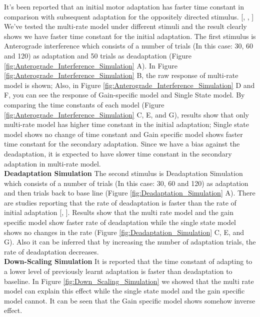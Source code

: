 \documentclass[9pt,twocolumn]{paper-template}
\begin{document}
It’s been reported that an initial motor adaptation has faster time constant in comparison with subsequent adaptation for the oppositely directed stimulus. [\cite{Bizzi}, \cite{shadmehr_jn}, \cite{Wolpert}] We’ve tested the multi-rate model under different stimuli and the result clearly shows we have faster time constant for the initial adaptation. 
The first stimulus is Anterograde interference which consists of a number of trials (In this case: 30, 60 and 120) as adaptation and 50 trials as deadaptation (Figure \ref{fig:Anterograde_Interference_Simulation} A). In Figure \ref{fig:Anterograde_Interference_Simulation} B, the raw response of multi-rate model is shown; Also, in Figure \ref{fig:Anterograde_Interference_Simulation} D and F, you can see the response of Gain-specific model and Single State model. By comparing the time constants of each model (Figure \ref{fig:Anterograde_Interference_Simulation} C, E, and G), results show that only multi-rate model has higher time constant in the initial adaptation; Single state model shows no change of time constant and Gain specific model shows faster time constant for the secondary adaptation. Since we have a bias against the deadaptation, it is expected to have slower time constant in the secondary adaptation in multi-rate model.\\



\textbf{Deadaptation Simulation }
The second stimulus is Deadaptation Simulation which consists of a number of trials (In this case: 30, 60 and 120) as adaptation and then trials back to base line (Figure \ref{fig:Deadaptation_Simulation} A). There are studies reporting that the rate of deadaptation is faster than the rate of initial adaptation [\cite{Wolpert}, \cite{shadmehr_jnp}]. Results show that the multi rate model and the gain specific model show faster rate of deadaptation while the single state model shows no changes in the rate (Figure \ref{fig:Deadaptation_Simulation} C, E, and G). Also it can be inferred that by increasing the number of adaptation trials, the rate of deadaptation decreases.\\


\textbf{Down-Scaling Simulation}
It is reported that the time constant of adapting to a lower level of previously learnt adaptation is faster than deadaptation to baseline. In Figure \ref{fig:Down_Scaling_Simulation} we showed that the multi rate model can explain this effect while the single state model and the gain specific model cannot. It can be seen that the Gain specific model shows somehow inverse effect.
\end{document}
